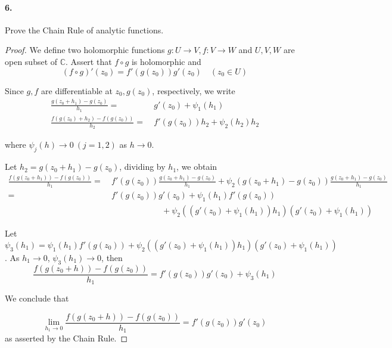 \documentclass[12pt, a4paper, oneside]{article}
\begin{document}
\paragraph{6.}Prove the Chain Rule of analytic functions.
\begin{proof}
    We define two holomorphic functions $g:U\rightarrow V, f:V\rightarrow W$ and $U, V, W$ are open subset of $\mathbb{C}$. Assert that $f\circ g$ is holomorphic and
    \begin{equation*}
        (f\circ g)'(z_0)=f'(g(z_0))g'(z_0)\quad (z_0\in U)
    \end{equation*}

    Since $g, f$ are differentiable at $z_0, g(z_0)$, respectively, we write
    \begin{equation*}
        \begin{aligned}
            \frac{g(z_0+h_1)-g(z_0)}{h_1} =&\  g'(z_0)+\psi_1(h_1)\\
            \frac{f(g(z_0)+h_2)-f(g(z_0))}{h_2}=&\ f'(g(z_0))h_2+\psi_2(h_2)h_2
        \end{aligned}
    \end{equation*}

    where $\psi_j(h)\rightarrow 0\ (j = 1, 2)$ as $h\rightarrow 0$. 
    
    Let $h_2 = g(z_0+h_1)-g(z_0)$, dividing by $h_1$, we obtain
    \begin{equation*}
        \begin{aligned}
            \frac{f(g(z_0+h_1))-f(g(z_0))}{h_1}=&\ f'(g(z_0))\frac{g(z_0+h_1)-g(z_0)}{h_1}+\psi_2(g(z_0+h_1)-g(z_0))\frac{g(z_0+h_1)-g(z_0)}{h_1}\\
            =&\ f'(g(z_0))g'(z_0)+\psi_1(h_1)f'(g(z_0))\\
            &\quad\quad\quad\quad\quad\quad\ +\psi_2((g'(z_0)+\psi_1(h_1))h_1)(g'(z_0)+\psi_1(h_1))
        \end{aligned}
    \end{equation*}
    
    Let $\psi_3(h_1) = \psi_1(h_1)f'(g(z_0))+\psi_2((g'(z_0)+\psi_1(h_1))h_1)(g'(z_0)+\psi_1(h_1))$. As $h_1\rightarrow 0$, $\psi_3(h_1)\rightarrow 0$, then
    \begin{equation*}
        \frac{f(g(z_0+h))-f(g(z_0))}{h_1}= f'(g(z_0))g'(z_0)+\psi_3(h_1)
    \end{equation*}

    We conclude that

    \begin{equation*}
        \lim_{h_1\rightarrow 0}\frac{f(g(z_0+h))-f(g(z_0))}{h_1}= f'(g(z_0))g'(z_0)
    \end{equation*}
    as asserted by the Chain Rule.
\end{proof}
\end{document}
